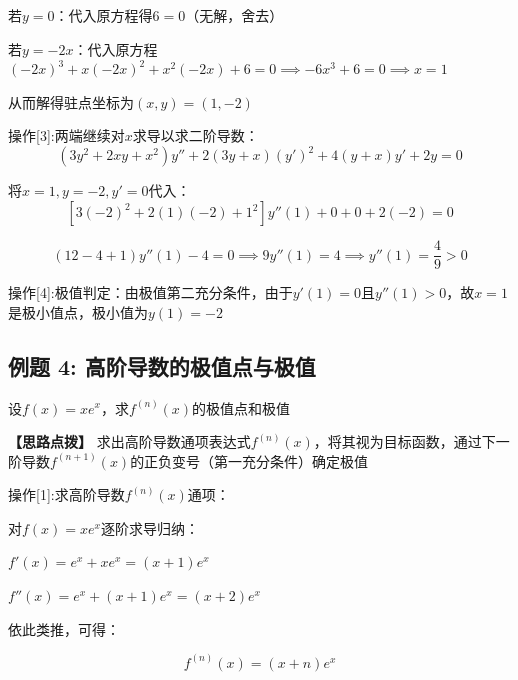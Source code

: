 \documentclass[11pt,a4paper,UTF8]{ctexart}
\begin{document}
\begin{solbox}[分步推导与答题规范]
  若$y = 0$：代入原方程得$6 = 0$（无解，舍去）

  若$y = -2x$：代入原方程$(-2x)^3 + x(-2x)^2 + x^2(-2x) + 6 = 0 \implies -6x^3 + 6 = 0 \implies x = 1$
\end{solbox}

从而解得驻点坐标为$(x, y) = (1, -2)$

操作[3]:两端继续对$x$求导以求二阶导数：
\begin{equation*}
(3y^2 + 2xy + x^2)y'' + 2(3y + x)(y')^2 + 4(y + x)y' + 2y = 0
\end{equation*}


将$x = 1, y = -2, y' = 0$代入：
\begin{equation*}
\left[3(-2)^2 + 2(1)(-2) + 1^2\right] y''(1) + 0 + 0 + 2(-2) = 0
\end{equation*}



\begin{equation*}
(12 - 4 + 1) y''(1) - 4 = 0 \implies 9 y''(1) = 4 \implies y''(1) = \frac{4}{9} > 0
\end{equation*}

操作[4]:极值判定：由极值第二充分条件，由于$y'(1) = 0$且$y''(1) > 0$，故$x = 1$是极小值点，\textit{}极小值为$y(1) = -2$\textit{}


\subsection{例题 4: 高阶导数的极值点与极值}

设$f(x) = xe^x$，求$f^{(n)}(x)$的极值点和极值

\textbf{\color{DeepPurple}【思路点拨】} 求出高阶导数通项表达式$f^{(n)}(x)$，将其视为目标函数，通过下一阶导数$f^{(n+1)}(x)$的正负变号（第一充分条件）确定极值


操作[1]:求高阶导数$f^{(n)}(x)$通项：

\begin{solbox}[分步推导与答题规范]
对$f(x) = xe^x$逐阶求导归纳：

$f'(x) = e^x + xe^x = (x + 1)e^x$

$f''(x) = e^x + (x + 1)e^x = (x + 2)e^x$

依此类推，可得：


\begin{equation*}
f^{(n)}(x) = (x + n)e^x
\end{equation*}

\end{solbox}
\end{document}
